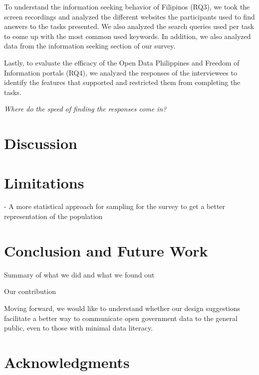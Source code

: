 \documentclass{sigchi}
\begin{document}
To understand the information seeking behavior of Filipinos (RQ3), we took the screen recordings and analyzed the different websites the participants used to find answers to the tasks presented. We also analyzed the search queries used per task to come up with the most common used keywords. In addition, we also analyzed data from the information seeking section of our survey.

Lastly, to evaluate the efficacy of the Open Data Philippines and Freedom of Information portals (RQ4), we analyzed the responses of the interviewees to identify the features that supported and restricted them from completing the tasks. 

\textit{Where do the speed of finding the responses come in?}

\section{Discussion}
\begin{comment}
From model paper:
We address our frst two research questions by summarizing our results. We then discuss insights to broader policy implications to improve the feasibility of online grocery delivery services within low-income and transportation-scarce regions. We conclude by contributing design implications for how online-grocery service interfaces can address participant barriers to using such services. To answer our fnal research question, we leverage past HCI literature to support our implications and further extend the literature.
\end{comment}


\section{Limitations}
- A more statistical approach for sampling for the survey to get a better representation of the population

\section{Conclusion and Future Work}
Summary of what we did and what we found out

Our contribution

Moving forward, we would like to understand whether our design suggestions facilitate a better way to communicate open government data to the general public, even to those with minimal data literacy. 

\section{Acknowledgments}
\end{document}
